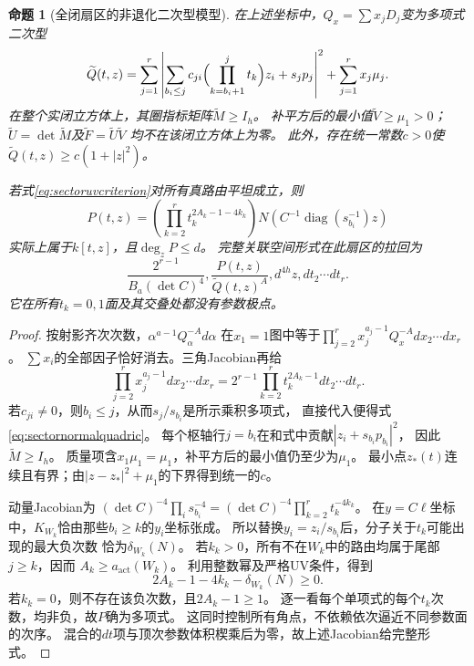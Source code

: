 \documentclass[11pt,a4paper]{ctexart}
\theoremstyle{cnplain}\newtheorem{theorem}{定理}[section]
\newtheorem{proposition}[theorem]{命题}
\theoremstyle{definition}\newtheorem{definition}[theorem]{定义}
\theoremstyle{remark}\newtheorem{remark}[theorem]{注}
\begin{document}
\begin{proposition}[全闭扇区的非退化二次型模型]
\label{prop:sectorgreedy}
在上述坐标中，$Q_x=\sum x_jD_j$变为多项式二次型
\begin{equation}
 \widetilde Q(t,z)=
 \sum_{j=1}^r\left|
   \sum_{b_i\leq j}c_{ji}\Bigl(\prod_{k=b_i+1}^j t_k\Bigr)z_i+s_jp_j
 \right|^2+\sum_{j=1}^r x_j\mu_j .
 \label{eq:sectornormalquadric}
\end{equation}
在整个实闭立方体上，其圈指标矩阵$\widetilde M\geq I_h$。
补平方后的最小值$\widetilde V\geq\mu_1>0$；
$\widetilde U=\det\widetilde M$及$\widetilde F=\widetilde U\widetilde V$
均不在该闭立方体上为零。
此外，存在统一常数$c>0$使
$\widetilde Q(t,z)\geq c(1+|z|^2)$。

若式\eqref{eq:sectoruvcriterion}对所有真路由平坦成立，则
\begin{equation}
 P(t,z)=\left(\prod_{k=2}^r t_k^{2A_k-1-4k_k}\right)
 N\left(C^{-1}\operatorname{diag}(s_{b_i}^{-1})z\right)
 \label{eq:sectorpolynomialnumerator}
\end{equation}
实际上属于$k[t,z]$，且$\deg_zP\leq d$。
完整关联空间形式在此扇区的拉回为
\begin{equation}
 \frac{2^{r-1}}{B_a(\det C)^4},
 \frac{P(t,z)}{\widetilde Q(t,z)^A},d^{4h}z,dt_2\cdots dt_r.
 \label{eq:sectorregularform}
\end{equation}
它在所有$t_k=0,1$面及其交叠处都没有参数极点。
\end{proposition}

\begin{proof}
按射影齐次次数，$\alpha^{a-1}Q_\alpha^{-A}d\alpha$
在$x_1=1$图中等于$\prod_{j=2}^r x_j^{a_j-1}Q_x^{-A}dx_2\cdots dx_r$。
$\sum x_i$的全部因子恰好消去。三角Jacobian再给
\[
 \prod_{j=2}^r x_j^{a_j-1}dx_2\cdots dx_r
 =2^{r-1}\prod_{k=2}^r t_k^{2A_k-1}dt_2\cdots dt_r.
\]
若$c_{ji}\ne0$，则$b_i\leq j$，从而$s_j/s_{b_i}$是所示乘积多项式，
直接代入便得式\eqref{eq:sectornormalquadric}。
每个枢轴行$j=b_i$在和式中贡献$|z_i+s_{b_i}p_{b_i}|^2$，
因此$\widetilde M\geq I_h$。
质量项含$x_1\mu_1=\mu_1$，补平方后的最小值仍至少为$\mu_1$。
最小点$z_*(t)$连续且有界；由$|z-z_*|^2+\mu_1$的下界得到统一的$c$。

动量Jacobian为
$(\det C)^{-4}\prod_i s_{b_i}^{-4}
=(\det C)^{-4}\prod_{k=2}^r t_k^{-4k_k}$。
在$y=C\ell$坐标中，$K_{W_k}$恰由那些$b_i\geq k$的$y_i$坐标张成。
所以替换$y_i=z_i/s_{b_i}$后，分子关于$t_k$可能出现的最大负次数
恰为$\delta_{W_k}(N)$。
若$k_k>0$，所有不在$W_k$中的路由均属于尾部$j\geq k$，因而
$A_k\geq a_{\mathrm{act}}(W_k)$。
利用整数幂及严格UV条件，得到
\[
 2A_k-1-4k_k-\delta_{W_k}(N)\geq0.
\]
若$k_k=0$，则不存在该负次数，且$2A_k-1\geq1$。
逐一看每个单项式的每个$t_k$次数，均非负，故$P$确为多项式。
这同时控制所有角点，不依赖依次逼近不同参数面的次序。
混合的$dt$项与顶次参数体积楔乘后为零，故上述Jacobian给完整形式。
\end{proof}
\end{document}
